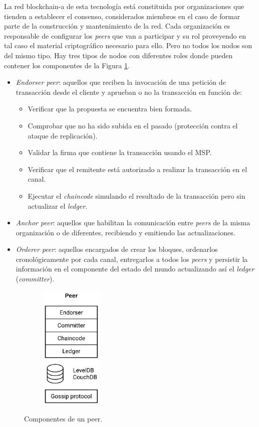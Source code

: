 \documentclass[12pt,a4paper, twoside]{report}
\begin{document}
	La red \gls{blockchain-a} de esta tecnología está constituida por organizaciones que tienden a establecer el consenso, considerados miembros en el caso de formar parte de la construcción y mantenimiento de la red. Cada organización es responsable de configurar los  \textit{peers} que van a participar y su rol proveyendo en tal caso el material criptográfico necesario para ello. Pero no todos los nodos son del mismo tipo. Hay tres tipos de nodos con diferentes roles donde pueden contener los componentes de la Figura \ref{fig:stateArt_hfpeer}.
	
	\begin{itemize}
		\item \textit{Endorser peer}: aquellos que reciben la invocación de una petición de transacción desde el cliente y aprueban o no la transacción en función de:
		
			\begin{itemize}
				\item Verificar que la propuesta se encuentra bien formada.
				\item Comprobar que no ha sido subida en el pasado (protección contra el ataque de replicación).
				\item Validar la firma que contiene la transacción usando el MSP.
				\item Verificar que el remitente está autorizado a realizar la transacción en el canal.
				\item Ejecutar el \textit{\gls{chaincode}} simulando el resultado de la transacción pero sin actualizar el \textit{ledger}.
			\end{itemize}
		 
		\item \textit{Anchor peer}: aquellos que habilitan la comunicación entre \textit{peers} de la misma organización o de diferentes, recibiendo y emitiendo las actualizaciones.
		\item \textit{Orderer peer}: aquellos encargados de crear los bloques, ordenarlos cronológicamente por cada canal, entregarlos a todos los \textit{peers} y persistir la información en el componente del estado del mundo actualizando así el \textit{ledger} (\textit{committer}). 
	\end{itemize}
	
	\begin{figure}[!ht]   
		\caption{Componentes de un peer.} 
		\begin{center} 
			\includegraphics[width=5cm,height=6cm]{Images/stateArt/hf_peer} \\
			\label{fig:stateArt_hfpeer} 
		\end{center}  
	\end{figure}
	
\end{document}

